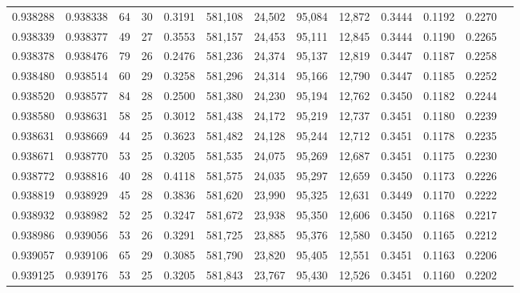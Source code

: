 \begin{tabular}{rrrrrrrrrrrrr}
0.938288 & 0.938338 &    64 &  30 &                                     0.3191 & 581,108 &  24,502 &  95,084 &  12,872 & 0.3444 & 0.1192 & 0.2270 \\
0.938339 & 0.938377 &    49 &  27 &                                     0.3553 & 581,157 &  24,453 &  95,111 &  12,845 & 0.3444 & 0.1190 & 0.2265 \\
0.938378 & 0.938476 &    79 &  26 &                                     0.2476 & 581,236 &  24,374 &  95,137 &  12,819 & 0.3447 & 0.1187 & 0.2258 \\
0.938480 & 0.938514 &    60 &  29 &                                     0.3258 & 581,296 &  24,314 &  95,166 &  12,790 & 0.3447 & 0.1185 & 0.2252 \\
0.938520 & 0.938577 &    84 &  28 &                                     0.2500 & 581,380 &  24,230 &  95,194 &  12,762 & 0.3450 & 0.1182 & 0.2244 \\
0.938580 & 0.938631 &    58 &  25 &                                     0.3012 & 581,438 &  24,172 &  95,219 &  12,737 & 0.3451 & 0.1180 & 0.2239 \\
0.938631 & 0.938669 &    44 &  25 &                                     0.3623 & 581,482 &  24,128 &  95,244 &  12,712 & 0.3451 & 0.1178 & 0.2235 \\
0.938671 & 0.938770 &    53 &  25 &                                     0.3205 & 581,535 &  24,075 &  95,269 &  12,687 & 0.3451 & 0.1175 & 0.2230 \\
0.938772 & 0.938816 &    40 &  28 &                                     0.4118 & 581,575 &  24,035 &  95,297 &  12,659 & 0.3450 & 0.1173 & 0.2226 \\
0.938819 & 0.938929 &    45 &  28 &                                     0.3836 & 581,620 &  23,990 &  95,325 &  12,631 & 0.3449 & 0.1170 & 0.2222 \\
0.938932 & 0.938982 &    52 &  25 &                                     0.3247 & 581,672 &  23,938 &  95,350 &  12,606 & 0.3450 & 0.1168 & 0.2217 \\
0.938986 & 0.939056 &    53 &  26 &                                     0.3291 & 581,725 &  23,885 &  95,376 &  12,580 & 0.3450 & 0.1165 & 0.2212 \\
0.939057 & 0.939106 &    65 &  29 &                                     0.3085 & 581,790 &  23,820 &  95,405 &  12,551 & 0.3451 & 0.1163 & 0.2206 \\
0.939125 & 0.939176 &    53 &  25 &                                     0.3205 & 581,843 &  23,767 &  95,430 &  12,526 & 0.3451 & 0.1160 & 0.2202 \\

\end{tabular}
